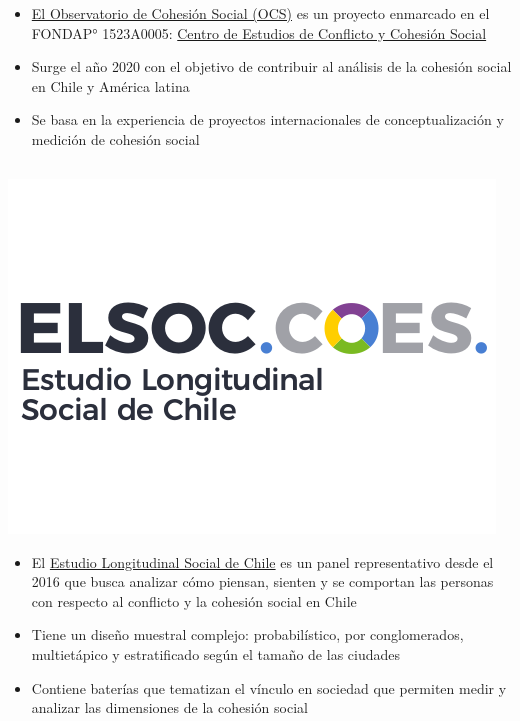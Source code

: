 \documentclass[
  spanish,
  letterpaper,
  DIV=11,
  numbers=noendperiod,
  oneside]{scrartcl}
\begin{document}
\begin{itemize}
\item
  \href{https://ocs-coes.com/}{El Observatorio de Cohesión Social (OCS)}
  es un proyecto enmarcado en el FONDAP° 1523A0005:
  \href{https://coes.cl/}{Centro de Estudios de Conflicto y Cohesión
  Social}
\item
  Surge el año 2020 con el objetivo de contribuir al análisis de la
  cohesión social en Chile y América latina
\item
  Se basa en la experiencia de proyectos internacionales de
  conceptualización y medición de cohesión social
\end{itemize}

\subsection{}\label{section}

\hfill
\includegraphics[width=1\linewidth,height=\textheight,keepaspectratio]{images/elsoc.png}

\begin{itemize}
\item
  El \href{https://coes.cl/elsoc/}{Estudio Longitudinal Social de Chile}
  es un panel representativo desde el 2016 que busca analizar cómo
  piensan, sienten y se comportan las personas con respecto al conflicto
  y la cohesión social en Chile
\item
  Tiene un diseño muestral complejo: probabilístico, por conglomerados,
  multietápico y estratificado según el tamaño de las ciudades
\item
  Contiene baterías que tematizan el vínculo en sociedad que permiten
  medir y analizar las dimensiones de la cohesión social
\end{itemize}
\end{document}
